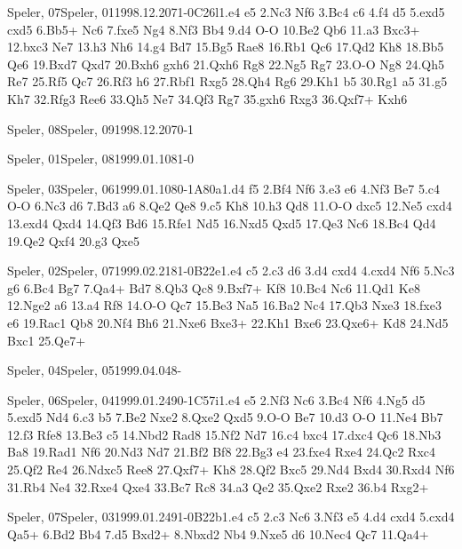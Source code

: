 \documentclass[twocolumn,a4paper,10pt]{report}
\begin{document}
\begin{chessgame}{Speler, 07}{Speler, 01}{1998.12.20}{7}{1-0}{C26l}{1.e4 e5 2.Nc3 Nf6 3.Bc4 c6 4.f4 d5 5.exd5 cxd5 6.Bb5+ Nc6 7.fxe5 Ng4 8.Nf3 Bb4 9.d4 O-O 10.Be2 Qb6 11.a3 Bxc3+ 12.bxc3 Ne7 13.h3 Nh6 14.g4 Bd7 15.Bg5 Rae8 16.Rb1 Qc6 17.Qd2 Kh8 18.Bb5 Qe6 19.Bxd7 Qxd7 20.Bxh6 gxh6 21.Qxh6 Rg8 22.Ng5 Rg7 23.O-O Ng8 24.Qh5 Re7 25.Rf5 Qc7 26.Rf3 h6 27.Rbf1 Rxg5 28.Qh4 Rg6 29.Kh1 b5 30.Rg1 a5 31.g5 Kh7 32.Rfg3 Ree6 33.Qh5 Ne7 34.Qf3 Rg7 35.gxh6 Rxg3 36.Qxf7+ Kxh6}\end{chessgame}
\begin{chessempty}{Speler, 08}{Speler, 09}{1998.12.20}{7}{0-1}{}\end{chessempty}
\begin{chessempty}{Speler, 01}{Speler, 08}{1999.01.10}{8}{1-0}{}\end{chessempty}
\begin{chessgame}{Speler, 03}{Speler, 06}{1999.01.10}{8}{0-1}{A80a}{1.d4 f5 2.Bf4 Nf6 3.e3 e6 4.Nf3 Be7 5.c4 O-O 6.Nc3 d6 7.Bd3 a6 8.Qe2 Qe8 9.c5 Kh8 10.h3 Qd8 11.O-O dxc5 12.Ne5 cxd4 13.exd4 Qxd4 14.Qf3 Bd6 15.Rfe1 Nd5 16.Nxd5 Qxd5 17.Qe3 Nc6 18.Bc4 Qd4 19.Qe2 Qxf4 20.g3 Qxe5}\end{chessgame}
\begin{chessgame}{Speler, 02}{Speler, 07}{1999.02.21}{8}{1-0}{B22e}{1.e4 c5 2.c3 d6 3.d4 cxd4 4.cxd4 Nf6 5.Nc3 g6 6.Bc4 Bg7 7.Qa4+ Bd7 8.Qb3 Qc8 9.Bxf7+ Kf8 10.Bc4 Nc6 11.Qd1 Ke8 12.Nge2 a6 13.a4 Rf8 14.O-O Qc7 15.Be3 Na5 16.Ba2 Nc4 17.Qb3 Nxe3 18.fxe3 e6 19.Rac1 Qb8 20.Nf4 Bh6 21.Nxe6 Bxe3+ 22.Kh1 Bxe6 23.Qxe6+ Kd8 24.Nd5 Bxc1 25.Qe7+}\end{chessgame}
\begin{chessempty}{Speler, 04}{Speler, 05}{1999.04.04}{8}{\textonehalf-\textonehalf}{}\end{chessempty}
\begin{chessgame}{Speler, 06}{Speler, 04}{1999.01.24}{9}{0-1}{C57i}{1.e4 e5 2.Nf3 Nc6 3.Bc4 Nf6 4.Ng5 d5 5.exd5 Nd4 6.c3 b5 7.Be2 Nxe2 8.Qxe2 Qxd5 9.O-O Be7 10.d3 O-O 11.Ne4 Bb7 12.f3 Rfe8 13.Be3 c5 14.Nbd2 Rad8 15.Nf2 Nd7 16.c4 bxc4 17.dxc4 Qc6 18.Nb3 Ba8 19.Rad1 Nf6 20.Nd3 Nd7 21.Bf2 Bf8 22.Bg3 e4 23.fxe4 Rxe4 24.Qc2 Rxc4 25.Qf2 Re4 26.Ndxc5 Ree8 27.Qxf7+ Kh8 28.Qf2 Bxc5 29.Nd4 Bxd4 30.Rxd4 Nf6 31.Rb4 Ne4 32.Rxe4 Qxe4 33.Bc7 Rc8 34.a3 Qe2 35.Qxe2 Rxe2 36.b4 Rxg2+}\end{chessgame}
\begin{chessgame}{Speler, 07}{Speler, 03}{1999.01.24}{9}{1-0}{B22b}{1.e4 c5 2.c3 Nc6 3.Nf3 e5 4.d4 cxd4 5.cxd4 Qa5+ 6.Bd2 Bb4 7.d5 Bxd2+ 8.Nbxd2 Nb4 9.Nxe5 d6 10.Nec4 Qc7 11.Qa4+}\end{chessgame}
\end{document}
